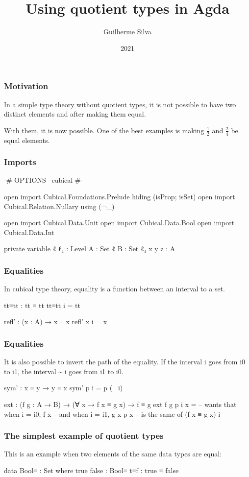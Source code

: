 \documentclass{beamer}
\title{Using quotient types in Agda}
\author{Guilherme Silva}
\date{2021}
\begin{document}
\frame{\titlepage}

\begin{frame}
  \frametitle{Motivation}
  In a simple type theory without quotient types,
  it is not possible to have two distinct elements and after
  making them equal.

  With them, it is now possible.
  One of the best examples is making $ \frac{1}{2} $ and $ \frac{2}{4} $ be equal elements.
\end{frame}

\begin{frame}
  \frametitle{Imports}
  \begin{code}
  {-# OPTIONS --cubical #-}

  open import Cubical.Foundations.Prelude hiding (isProp; isSet)
  open import Cubical.Relation.Nullary using (¬_)

  open import Cubical.Data.Unit
  open import Cubical.Data.Bool
  open import Cubical.Data.Int

  private variable
    ℓ ℓ₁ : Level
    A : Set ℓ
    B : Set ℓ₁
    x y z : A
  \end{code}
\end{frame}

\begin{frame}
  \frametitle{Equalities}
  In cubical type theory, equality is a function between an interval to a set.
  \begin{code}
  tt≡tt : tt ≡ tt
  tt≡tt i = tt

  refl' : (x : A) → x ≡ x
  refl' x i = x
  \end{code}

\end{frame}

\begin{frame}
  \frametitle{Equalities}
  It is also possible to invert the path of the equality.
  If the interval i goes from i0 to i1, the interval \~{} i goes from i1 to i0.

  \begin{code}
  sym' : x ≡ y → y ≡ x
  sym' p i = p (~ i)

  ext : (f g : A → B) → (∀ x → f x ≡ g x) → f ≡ g
  ext f g p i x = -- wants that when i = i0, f x
                  --        and when i = i1, g x
                  p x -- is the same of (f x ≡ g x)
                  i
  \end{code}

\end{frame}

\begin{frame}
  \frametitle{The simplest example of quotient types}
  This is an example when two elements of the same data types are equal:
  \begin{code}
  data Bool≡ : Set where
    true false : Bool≡
    t≡f : true ≡ false
  \end{code}
\end{frame}
\end{document}

